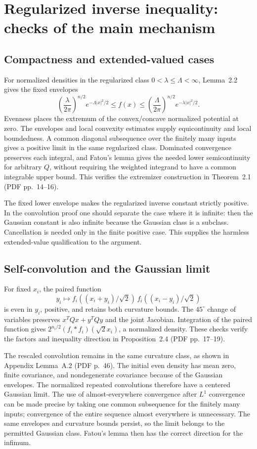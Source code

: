 \documentclass[10pt]{article}
\begin{document}
\section*{Regularized inverse inequality: checks of the main mechanism}
\subsection*{Compactness and extended-valued cases}
For normalized densities in the regularized class \(0<\lambda\le\Lambda<\infty\), Lemma 2.2 gives the fixed envelopes \[\left(\frac{\lambda}{2\pi}\right)^{n/2}e^{-\Lambda|x|^2/2}
 \le f(x)\le
 \left(\frac{\Lambda}{2\pi}\right)^{n/2}e^{-\lambda|x|^2/2}.\] Evenness places the extremum of the convex/concave normalized potential at zero. The envelopes and local convexity estimates supply equicontinuity and local boundedness. A common diagonal subsequence over the finitely many inputs gives a positive limit in the same regularized class. Dominated convergence preserves each integral, and Fatou’s lemma gives the needed lower semicontinuity for arbitrary \(Q\), without requiring the weighted integrand to have a common integrable upper bound. This verifies the extremizer construction in Theorem 2.1 (PDF pp. 14–16).\par
The fixed lower envelope makes the regularized inverse constant strictly positive. In the convolution proof one should separate the case where it is infinite: then the Gaussian constant is also infinite because the Gaussian class is a subclass. Cancellation is needed only in the finite positive case. This supplies the harmless extended-value qualification to the argument.\par
\subsection*{Self-convolution and the Gaussian limit}
For fixed \(x_i\), the paired function \[y_i\longmapsto
 f_i((x_i+y_i)/\sqrt2)\,f_i((x_i-y_i)/\sqrt2)\] is even in \(y_i\), positive, and retains both curvature bounds. The \(45^\circ\) change of variables preserves \(x^TQx+y^TQy\) and the joint Jacobian. Integration of the paired function gives \(2^{n_i/2}(f_i*f_i)(\sqrt2x_i)\), a normalized density. These checks verify the factors and inequality direction in Proposition 2.4 (PDF pp. 17–19).\par
The rescaled convolution remains in the same curvature class, as shown in Appendix Lemma A.2 (PDF p. 46). The initial even density has mean zero, finite covariance, and nondegenerate covariance because of the Gaussian envelopes. The normalized repeated convolutions therefore have a centered Gaussian limit. The use of almost-everywhere convergence after \(L^1\) convergence can be made precise by taking one common subsequence for the finitely many inputs; convergence of the entire sequence almost everywhere is unnecessary. The same envelopes and curvature bounds persist, so the limit belongs to the permitted Gaussian class. Fatou’s lemma then has the correct direction for the infimum.\par
\end{document}
